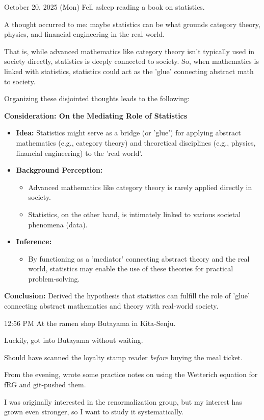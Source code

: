 \documentclass[dvipdfmx, autodetect-engine, aspectratio=169, 10.5pt]{beamer}
\begin{document}
\begin{frame}{October 20, 2025 (Mon)}
\tiny
Fell asleep reading a book on statistics.

A thought occurred to me: maybe statistics can be what grounds category theory, physics, and financial engineering in the real world.

That is, while advanced mathematics like category theory isn't typically used in society directly, statistics is deeply connected to society. So, when mathematics is linked with statistics, statistics could act as the 'glue' connecting abstract math to society.

Organizing these disjointed thoughts leads to the following:

\textbf{Consideration: On the Mediating Role of Statistics}
\begin{itemize}
    \item \textbf{Idea:} Statistics might serve as a bridge (or 'glue') for applying abstract mathematics (e.g., category theory) and theoretical disciplines (e.g., physics, financial engineering) to the 'real world'.
    \item \textbf{Background Perception:}
    \begin{itemize}
        \item Advanced mathematics like category theory is rarely applied directly in society.
        \item Statistics, on the other hand, is intimately linked to various societal phenomena (data).
    \end{itemize}
    \item \textbf{Inference:}
    \begin{itemize}
        \item By functioning as a 'mediator' connecting abstract theory and the real world, statistics may enable the use of these theories for practical problem-solving.
    \end{itemize}
\end{itemize}

\textbf{Conclusion:}
Derived the hypothesis that statistics can fulfill the role of 'glue' connecting abstract mathematics and theory with real-world society.

12:56 PM
At the ramen shop Butayama in Kita-Senju.

Luckily, got into Butayama without waiting.

Should have scanned the loyalty stamp reader \textit{before} buying the meal ticket.

From the evening, wrote some practice notes on using the Wetterich equation for fRG and git-pushed them.

I was originally interested in the renormalization group, but my interest has grown even stronger, so I want to study it systematically.
\end{frame}
\end{document}
